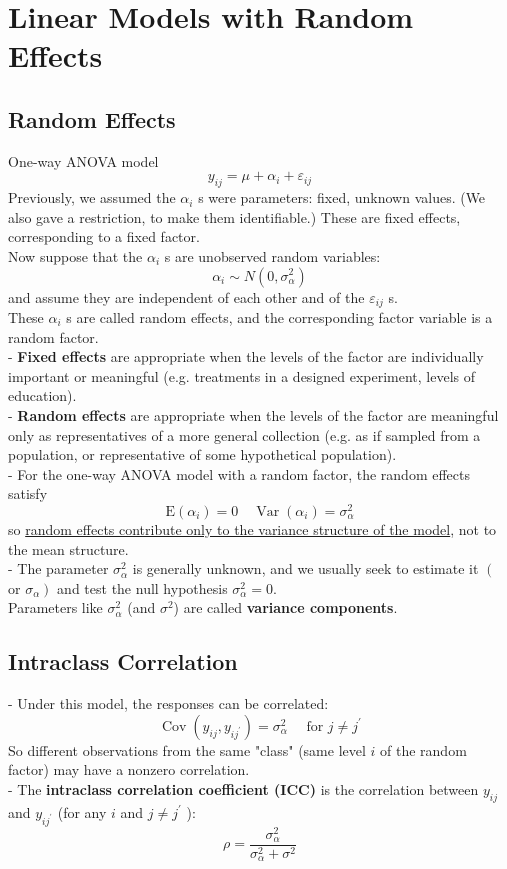 \documentclass[11pt,a4paper]{article}
\begin{document}
\section{ Linear Models with Random Effects}
\subsection{ Random Effects}
One-way ANOVA model
$$
y_{i j}=\mu+\alpha_{i}+\varepsilon_{i j}
$$
Previously, we assumed the $\alpha_{i}$ s were parameters: fixed, unknown values. (We also gave a restriction, to make them identifiable.) These are fixed effects, corresponding to a fixed factor.\\
Now suppose that the $\alpha_{i}$ s are unobserved random variables:
$$
\alpha_{i} \sim N\left(0, \sigma_{\alpha}^{2}\right)
$$
and assume they are independent of each other and of the $\varepsilon_{i j}$ s.\\
These $\alpha_{i}$ s are called random effects, and the corresponding factor variable is a random factor.\\

- \textbf{Fixed effects} are appropriate when the levels of the factor are individually important or meaningful (e.g. treatments in a designed experiment, levels of education).\\
- \textbf{Random effects} are appropriate when the levels of the factor are meaningful only as representatives of a more general collection (e.g. as if sampled from a population, or representative of some hypothetical population).\\

- For the one-way ANOVA model with a random factor, the random effects satisfy
$$
\mathrm{E}\left(\alpha_{i}\right)=0 \quad \operatorname{Var}\left(\alpha_{i}\right)=\sigma_{\alpha}^{2}
$$
so \underline{random effects contribute only to the variance structure of the model}, not to the mean structure.\\
- The parameter $\sigma_{\alpha}^{2}$ is generally unknown, and we usually seek to estimate it $\left(\right.$ or $\left.\sigma_{\alpha}\right)$ and test the null hypothesis $\sigma_{\alpha}^{2}=0 .$\\
Parameters like $\sigma_{\alpha}^{2}$ (and $\sigma^{2}$) are called \textbf{variance components}.\\

\subsection{ Intraclass Correlation}
- Under this model, the responses can be correlated:
$$
\operatorname{Cov}\left(y_{i j}, y_{i j^{\prime}}\right)=\sigma_{\alpha}^{2} \quad \text { for } j \neq j^{\prime}
$$
So different observations from the same "class" (same level $i$ of the random factor) may have a nonzero correlation.\\
- The \textbf{intraclass correlation coefficient (ICC)} is the correlation between $y_{i j}$ and $y_{i j^{\prime}}$ (for any $i$ and $j \neq j^{\prime}$ ):
$$
\rho=\frac{\sigma_{\alpha}^{2}}{\sigma_{\alpha}^{2}+\sigma^{2}}
$$
\end{document}
